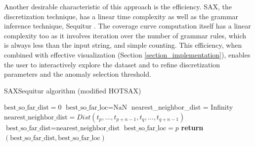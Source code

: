 \documentclass{llncs}
\begin{document}
Another desirable characteristic of this approach is the efficiency. SAX, the discretization technique, has a linear time complexity \cite{hot_sax} as well as the grammar inference technique, Sequitur \cite{sequitur}. The coverage curve computation itself has a linear complexity too as it involves iteration over the number of grammar rules, which is always less than the input string, and simple counting. This efficiency, when combined with effective visualization (Section \ref{section_implementation}), enables the user to interactively explore the dataset and to refine discretization parameters and the anomaly selection threshold.


\begin{algorithm}[!htp]
\caption{SAXSequitur algorithm (modified HOTSAX)}\label{algorithm2}
\begin{algorithmic}[1]
 \State $\text{best\_so\_far\_dist} = 0 $
 \State $\text{best\_so\_far\_loc} = \text{NaN} $
 \Statex{}
    \State nearest\_neighbor\_dist = Infinity
    \Statex{}
           \EndIf 
               \State $\text{nearest\_neighbor\_dist} = Dist (t_{p},...,t_{p+n-1}, t_{q},...,t_{q+n-1})$
           \EndIf 
       \EndIf 
    \EndFor
   \State $\text{best\_so\_far\_dist} = \text{nearest\_neighbor\_dist}$ 
   \State $\text{best\_so\_far\_loc} = p$
 \EndIf   
 \EndFor
 \State \textbf{return} $(\text{best\_so\_far\_dist}, \text{best\_so\_far\_loc})$
\EndProcedure
\end{algorithmic}
\end{algorithm}
\end{document}
